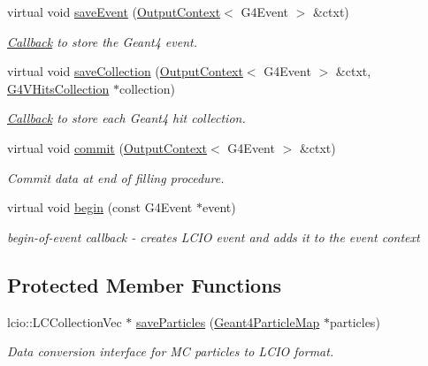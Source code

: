 \begin{DoxyCompactItemize}
virtual void \hyperlink{class_d_d4hep_1_1_simulation_1_1_geant4_output2_l_c_i_o_a86749213718dcb1ed4783ab86a374d92}{saveEvent} (\hyperlink{class_d_d4hep_1_1_simulation_1_1_geant4_output_action_1_1_output_context}{OutputContext}$<$ G4Event $>$ \&ctxt)
\begin{DoxyCompactList}\small\item\em \hyperlink{class_d_d4hep_1_1_callback}{Callback} to store the Geant4 event. \item\end{DoxyCompactList}\item 
virtual void \hyperlink{class_d_d4hep_1_1_simulation_1_1_geant4_output2_l_c_i_o_aeba8f94323098614ee901a3ff0642c73}{saveCollection} (\hyperlink{class_d_d4hep_1_1_simulation_1_1_geant4_output_action_1_1_output_context}{OutputContext}$<$ G4Event $>$ \&ctxt, \hyperlink{class_g4_v_hits_collection}{G4VHitsCollection} $\ast$collection)
\begin{DoxyCompactList}\small\item\em \hyperlink{class_d_d4hep_1_1_callback}{Callback} to store each Geant4 hit collection. \item\end{DoxyCompactList}\item 
virtual void \hyperlink{class_d_d4hep_1_1_simulation_1_1_geant4_output2_l_c_i_o_a86575064911453b387f237077fa8a969}{commit} (\hyperlink{class_d_d4hep_1_1_simulation_1_1_geant4_output_action_1_1_output_context}{OutputContext}$<$ G4Event $>$ \&ctxt)
\begin{DoxyCompactList}\small\item\em Commit data at end of filling procedure. \item\end{DoxyCompactList}\item 
virtual void \hyperlink{class_d_d4hep_1_1_simulation_1_1_geant4_output2_l_c_i_o_a36b7ecdf04169c4597bae18e021b60ea}{begin} (const G4Event $\ast$event)
\begin{DoxyCompactList}\small\item\em begin-\/of-\/event callback -\/ creates LCIO event and adds it to the event context \item\end{DoxyCompactList}\end{DoxyCompactItemize}
\subsection*{Protected Member Functions}
\begin{DoxyCompactItemize}
\item 
lcio::LCCollectionVec $\ast$ \hyperlink{class_d_d4hep_1_1_simulation_1_1_geant4_output2_l_c_i_o_a8c72e4dba5f1d6d5e38ea206e988d418}{saveParticles} (\hyperlink{class_d_d4hep_1_1_simulation_1_1_geant4_particle_map}{Geant4ParticleMap} $\ast$particles)
\begin{DoxyCompactList}\small\item\em Data conversion interface for MC particles to LCIO format. \item\end{DoxyCompactList}\end{DoxyCompactItemize}
